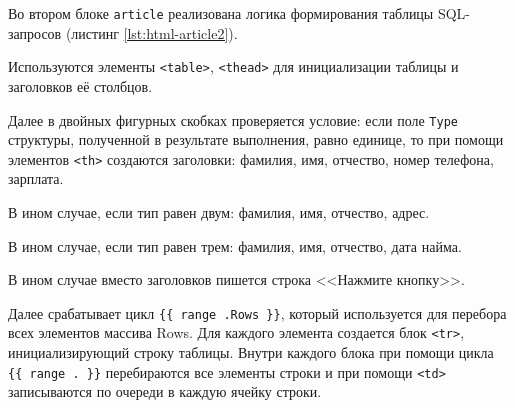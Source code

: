 \begin{listing}[h]
    \caption{Первый блок \texttt{article}}
    \label{lst:html-article1}
\end{listing}

Во втором блоке \texttt{article} реализована логика формирования таблицы SQL-запросов (листинг \ref{lst:html-article2}).

\begin{listing}[H]
    \caption{Логика формирования таблицы}
    \label{lst:html-article2}
\end{listing}

Используются элементы \texttt{<table>}, \texttt{<thead>} для инициализации таблицы и заголовков её столбцов.

Далее в двойных фигурных скобках проверяется условие: если поле \texttt{Type} структуры, полученной в результате выполнения,
равно единице, то при помощи элементов \texttt{<th>} создаются заголовки:
фамилия, имя, отчество, номер телефона, зарплата.

В ином случае, если тип равен двум:
фамилия, имя, отчество, адрес.

В ином случае, если тип равен трем:
фамилия, имя, отчество, дата найма.

В ином случае вместо заголовков пишется строка <<Нажмите кнопку>>.

Далее срабатывает цикл \texttt{\{\{ range .Rows \}\}}, который используется для перебора всех элементов массива Rows.
Для каждого элемента создается блок \texttt{<tr>}, инициализирующий строку таблицы.
Внутри каждого блока при помощи цикла \texttt{\{\{ range . \}\}} перебираются все элементы строки и при помощи
\texttt{<td>} записываются по очереди в каждую ячейку строки.
